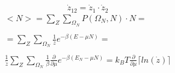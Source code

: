 \documentclass{article}
\begin{document}
		\begin{equation}
		\dot{z}_{12} = \dot{z}_1 \cdot \dot{z}_2
		\end{equation}
		\begin{equation}
		\begin{array}{cc}
		<N> = \sum_{Z}^{}\sum_{\Omega_N}P(\Omega_N, N) \cdot N = \\ \\
		 = \sum_{Z}^{}\sum_{\Omega_N}\frac{1}{\dot{z}}e^{-\beta (E - \mu N)} = \\ \\
		 \frac{1}{\dot{z}} \sum_{Z}^{}\sum_{\Omega_N} \frac{1}{\beta}\frac{\partial}{\partial \mu} 
		 e^{-\beta (E_N - \mu N)} = k_BT\frac{\partial}{\partial \mu}\lceil ln(\dot{z})\rceil
		\end{array}
		\end{equation}
		
		
		
		
		
		
		
		
		
		
		
\end{document}
